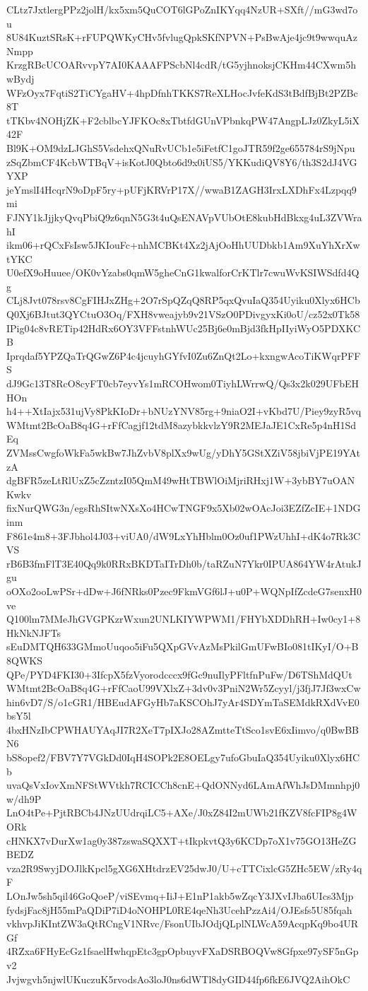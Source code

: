 CLtz7JxtlergPPz2jolH/kx5xm5QuCOT6lGPoZnIKYqq4NzUR+SXft//mG3wd7ou
8U84KuztSRsK+rFUPQWKyCHv5fvlugQpkSKfNPVN+PsBwAje4jc9t9wwquAzNmpp
KrzgRBcUCOARvvpY7AI0KAAAFPScbNl4cdR/tG5yjhnoksjCKHm44CXwm5hwBydj
WFzOyx7FqtiS2TiCYgaHV+4hpDfnhTKKS7ReXLHocJvfeKdS3tBdfBjBt2PZBc8T
tTKbv4NOHjZK+F2cblbcYJFKOc8xTbtfdGUnVPbnkqPW47AngpLJz0ZkyL5iX42F
Bl9K+OM9dzLJGhS5VsdehxQNuRvUCb1e5iFetfC1goJTR59f2ge655784rS9jNpu
zSqZbmCF4KcbWTBqV+isKotJ0Qbto6d9x0iUS5/YKKudiQV8Y6/th3S2dJ4VGYXP
jeYmslI4HcqrN9oDpF5ry+pUFjKRVrP17X//wwaB1ZAGH3IrxLXDhFx4Lzpqq9mi
FJNY1kJjjkyQvqPbiQ9z6qnN5G3t4uQsENAVpVUbOtE8kubHdBkxg4uL3ZVWrahI
ikm06+rQCxFsIsw5JKIouFc+nhMCBKt4Xz2jAjOoHhUUDbkb1Am9XuYhXrXwtYKC
U0efX9oHuuee/OK0vYzabs0qmW5gheCnG1kwalforCrKTlr7cwuWvKSIWSdfd4Qg
CLj8Jvt078rsv8CgFIHJxZHg+2O7rSpQZqQ8RP5qxQvuIaQ354Uyiku0Xlyx6HCb
Q0Xj6BJtut3QYCtuO3Oq/FXH8vweajyb9v21VSzO0PDivgyxKi0oU/cz52x0Tk58
IPig04c8vRETip42HdRx6OY3VFFstnhWUc25Bj6e0mBjd3fkHpIIyiWyO5PDXKCB
Iprqdaf5YPZQaTrQGwZ6P4c4jcuyhGYfvI0Zu6ZnQt2Lo+kxngwAcoTiKWqrPFFS
dJ9Gc13T8RcO8cyFT0cb7eyvYs1mRCOHwom0TiyhLWrrwQ/Qs3x2k029UFbEHHOn
h4++XtIajx531ujVy8PkKIoDr+bNUzYNV85rg+9niaO2I+vKbd7U/Piey9zyR5vq
WMtmt2BcOaB8q4G+rFfCagjf12tdM8azybkkvlzY9R2MEJaJE1CxRe5p4nH1SdEq
ZVMssCwgfoWkFa5wkBw7JhZvbV8plXx9wUg/yDhY5GStXZiV58jbiVjPE19YAtzA
dgBFR5zeLtRlUxZ5cZzntzI05QmM49wHtTBWlOiMjriRHxj1W+3ybBY7uOANKwkv
fixNurQWG3n/egsRhSItwNXsXo4HCwTNGF9x5Xb02wOAcJoi3EZfZcIE+1NDGinm
F861e4m8+3FJbhol4J03+viUA0/dW9LxYhHblm0Oz0uf1PWzUhhI+dK4o7Rk3CVS
rB6B3fmFlT3E40Qq9k0RRxBKDTaITrDh0b/taRZuN7Ykr0IPUA864YW4rAtukJgu
oOXo2ooLwPSr+dDw+J6fNRks0Pzec9FkmVGf6lJ+u0P+WQNpIfZcdeG7senxH0ve
Q100lm7MMeJhGVGPKzrWxun2UNLKIYWPWM1/FHYbXDDhRH+Iw0cy1+8HkNkNJFTs
sEuDMTQH633GMmoUuqoo5iFu5QXpGVvAzMsPkilGmUFwBIo081tIKyI/O+B8QWKS
QPe/PYD4FKI30+3IfcpX5fzVyorodcccx9fGc9nuIlyPFltfnPuFw/D6TShMdQUt
WMtmt2BcOaB8q4G+rFfCaoU99VXlxZ+3dv0v3PniN2Wr5Zcyyl/j3fjJ7Jf3wxCw
hin6vD7/S/o1cGR1/HBEudAFGyHb7aKSCOhJ7yAr4SDYmTaSEMdkRXdVvE0bsY5l
4bxHNzIbCPWHAUYAqJI7R2XeT7pIXJo28AZmtteTtSco1svE6xIimvo/q0BwBBN6
bS8opef2/FBV7Y7VGkDd0IqH4SOPk2E8OELgy7ufoGbuIaQ354Uyiku0Xlyx6HCb
uvaQsVxIovXmNFStWVtkh7RCICCh8cnE+QdONNyd6LAmAfWhJsDMmnhpj0w/dh9P
LnO4tPe+PjtRBCb4JNzUUdrqiLC5+AXe/J0xZ84I2mUWb21fKZV8fcFIP8g4WORk
cHNKX7vDurXw1ag0y387zswaSQXXT+tIkpkvtQ3y6KCDp7oX1v75GO13HeZGBEDZ
vza2R9SwyjDOJlkKpcl5gXG6XHtdrzEV25dwJ0/U+cTTCixlcG5ZHc5EW/zRy4qF
LOnJw5sh5qil46GoQoeP/viSEvmq+IiJ+E1nP1akb5wZqcY3JXvIJba6UIcs3Mjp
fydsjFac8jH55mPaQDiP7iD4oNOHPL0RE4qeNh3UcehPzzAi4/OJEsfs5U85fqah
vkhvpJiKIntZW3aQtRCngV1NRvc/FsonUIbJOdjQLplNLWcA59AcqpKq9bo4URGf
4RZxa6FHyEcGz1fsaelHwhqpEtc3gpOpbuyvFXaDSRBOQVw8Gfpxe97ySF5nGpv2
Jvjwgvh5njwlUKuczuK5rvodsAo3loJ0ns6dWTl8dyGID44fp6fkE6JVQ2AihOkC

